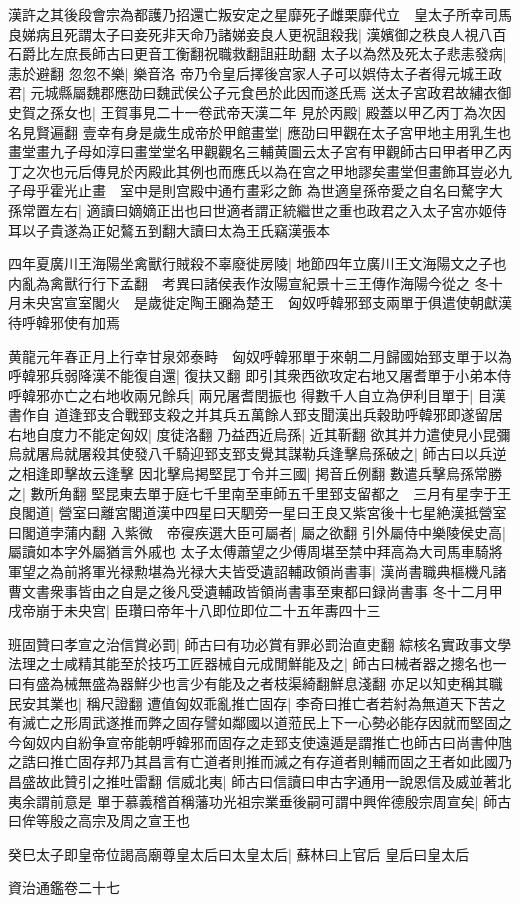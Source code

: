 漢許之其後段會宗為都護乃招還亡叛安定之星靡死子雌栗靡代立　皇太子所幸司馬良娣病且死謂太子曰妾死非天命乃諸娣妾良人更祝詛殺我|{
	漢嬪御之秩良人視八百石爵比左庶長師古曰更音工衡翻祝職救翻詛莊助翻}
太子以為然及死太子悲恚發病|{
	恚於避翻}
忽忽不樂|{
	樂音洛}
帝乃令皇后擇後宫家人子可以娯侍太子者得元城王政君|{
	元城縣屬魏郡應劭曰魏武侯公子元食邑於此因而遂氏焉}
送太子宮政君故繡衣御史賀之孫女也|{
	王賀事見二十一卷武帝天漢二年}
見於丙殿|{
	殿蓋以甲乙丙丁為次因名見賢遍翻}
壹幸有身是歲生成帝於甲館畫堂|{
	應劭曰甲觀在太子宮甲地主用乳生也畫堂畫九子母如淳曰畫堂堂名甲觀觀名三輔黄圖云太子宮有甲觀師古曰甲者甲乙丙丁之次也元后傳見於丙殿此其例也而應氏以為在宫之甲地謬矣畫堂但畫飾耳豈必九子母乎霍光止畫　室中是則宫殿中通冇畫彩之飾}
為世適皇孫帝愛之自名曰驁字大孫常置左右|{
	適讀曰嫡嫡正出也曰世適者謂正統繼世之重也政君之入太子宮亦姬侍耳以子貴遂為正妃鷔五到翻大讀曰太為王氏竊漢張本}


四年夏廣川王海陽坐禽獸行賊殺不辜廢徙房陵|{
	地節四年立廣川王文海陽文之子也内亂為禽獸行行下孟翻　考異曰諸侯表作汝陽宣紀景十三王傳作海陽今從之}
冬十月未央宮宣室閣火　是歲徙定陶王嚻為楚王　匈奴呼韓邪郅支兩單于俱遣使朝獻漢待呼韓邪使有加焉

黄龍元年春正月上行幸甘泉郊泰畤　匈奴呼韓邪單于來朝二月歸國始郅支單于以為呼韓邪兵弱降漢不能復自還|{
	復扶又翻}
即引其衆西欲攻定右地又屠耆單于小弟本侍呼韓邪亦亡之右地收兩兄餘兵|{
	兩兄屠耆閏振也}
得數千人自立為伊利目單于|{
	目漢書作自}
道逢郅支合戰郅支殺之并其兵五萬餘人郅支聞漢出兵穀助呼韓邪即遂留居右地自度力不能定匈奴|{
	度徒洛翻}
乃益西近烏孫|{
	近其靳翻}
欲其并力遣使見小昆彌烏就屠烏就屠殺其使發八千騎迎郅支郅支覺其謀勒兵逢擊烏孫破之|{
	師古曰以兵逆之相逢即擊故云逢擊}
因北擊烏掲堅昆丁令并三國|{
	掲音丘例翻}
數遣兵擊烏孫常勝之|{
	數所角翻}
堅昆東去單于庭七千里南至車師五千里郅支留都之　三月有星孛于王良閣道|{
	營室曰離宮閣道漢中四星曰天駟旁一星曰王良又紫宮後十七星絶漢抵營室曰閣道孛蒲内翻}
入紫微　帝寑疾選大臣可屬者|{
	屬之欲翻}
引外屬侍中樂陵侯史高|{
	屬讀如本字外屬猶言外戚也}
太子太傅蕭望之少傅周堪至禁中拜高為大司馬車騎將軍望之為前將軍光禄勲堪為光禄大夫皆受遺詔輔政領尚書事|{
	漢尚書職典樞機凡諸曹文書衆事皆由之自是之後凡受遺輔政皆領尚書事至東都曰録尚書事}
冬十二月甲戌帝崩于未央宫|{
	臣瓚曰帝年十八即位即位二十五年夀四十三}


班固贊曰孝宣之治信賞必罰|{
	師古曰有功必賞有罪必罰治直吏翻}
綜核名實政事文學法理之士咸精其能至於技巧工匠器械自元成閒鮮能及之|{
	師古曰械者器之摠名也一曰有盛為械無盛為器鮮少也言少有能及之者枝渠綺翻鮮息淺翻}
亦足以知吏稱其職民安其業也|{
	稱尺證翻}
遭值匈奴乖亂推亡固存|{
	李奇曰推亡者若紂為無道天下苦之有滅亡之形周武遂推而弊之固存譬如鄰國以道蒞民上下一心勢必能存因就而堅固之今匈奴内自紛争宣帝能朝呼韓邪而固存之走郅支使遠遁是謂推亡也師古曰尚書仲虺之誥曰推亡固存邦乃其昌言有亡道者則推而滅之有存道者則輔而固之王者如此國乃昌盛故此贊引之推吐雷翻}
信威北夷|{
	師古曰信讀曰申古字通用一說恩信及威並著北夷余謂前意是}
單于慕義稽首稱藩功光祖宗業垂後嗣可謂中興侔德殷宗周宣矣|{
	師古曰侔等殷之高宗及周之宣王也}


癸巳太子即皇帝位謁高廟尊皇太后曰太皇太后|{
	蘇林曰上官后}
皇后曰皇太后

資治通鑑卷二十七
